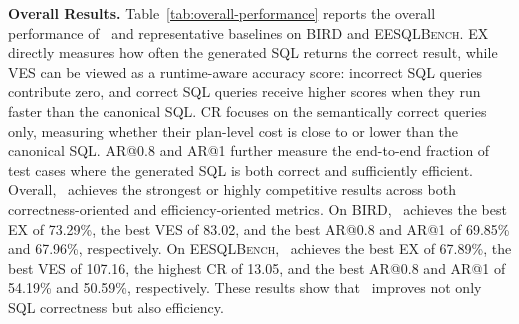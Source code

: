 \textbf{Overall Results.}
Table~\ref{tab:overall-performance} reports the overall performance of \toolname\ and representative baselines on \textsc{BIRD} and \textsc{EESQLBench}.
EX directly measures how often the generated SQL returns the correct result, while VES can be viewed as a runtime-aware accuracy score: incorrect SQL queries contribute zero, and correct SQL queries receive higher scores when they run faster than the canonical SQL.
CR focuses on the semantically correct queries only, measuring whether their plan-level cost is close to or lower than the canonical SQL.
AR@0.8 and AR@1 further measure the end-to-end fraction of test cases where the generated SQL is both correct and sufficiently efficient.
Overall, \toolname\ achieves the strongest or highly competitive results across both correctness-oriented and efficiency-oriented metrics.
On \textsc{BIRD}, \toolname\ achieves the best EX of 73.29\%, the best VES of 83.02, and the best AR@0.8 and AR@1 of 69.85\% and 67.96\%, respectively.
On \textsc{EESQLBench}, \toolname\ achieves the best EX of 67.89\%, the best VES of 107.16, the highest CR of 13.05, and the best AR@0.8 and AR@1 of 54.19\% and 50.59\%, respectively.
These results show that \toolname\ improves not only SQL correctness but also efficiency.

